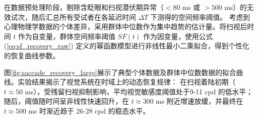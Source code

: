 

    
    
    




在数据预处理阶段，剔除含眨眼和扫视潜伏期异常（$<80$ ms 或 $>500$ ms）的无效试次，随后汇总所有受试者在各延迟时间 $\Delta T$ 下测得的空间频率阈值。
考虑到心理物理学数据的个体差异，采用群体中位数作为集中趋势的估计量。将扫视后时间 $t$ 作为自变量，群体空间频率阈值 $SF(t)$ 作为因变量，使用公式 (\ref{eq:sf_recovery_raw}) 定义的幂函数模型进行非线性最小二乘拟合，得到个性化的恢复曲线参数。

图\ref{fig:saccade_recovery_large}展示了典型个体数据及群体中位数数据的拟合曲线。实验结果揭示了视觉系统在时域上的动态恢复规律：
在扫视着陆初期（$t \approx 50$ ms），受残留扫视抑制影响，平均视觉敏感度阈值处于9-11 cpd 的低水平；随后，阈值随时间呈非线性快速回升，在 $t \approx 300$ ms 附近增速放缓，并最终在 $t \approx 500$ ms 时渐近趋于 26-28 cpd 的稳态水平。


